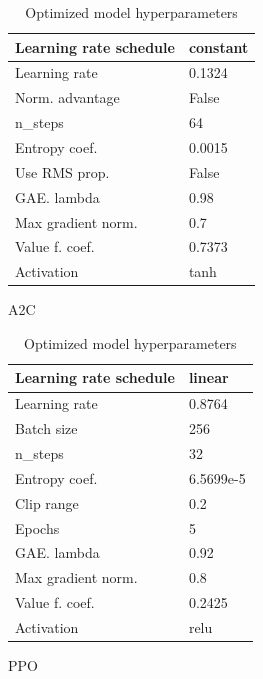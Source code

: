 \documentclass{article}
\begin{document}
\begin{table}[H]
	\begin{subtable}[h]{0.45\textwidth}
		\centering
		\begin{tabular}{|l | l|}
		\hline
		Learning rate schedule & constant  \\
		\hline
		Learning rate & 0.1324  \\
		\hline
		Norm. advantage & False  \\
		\hline
		n\_steps & 64  \\
		\hline
		Entropy coef. & 0.0015 \\
		\hline
		Use RMS prop. & False  \\
		\hline
		GAE. lambda & 0.98 \\
		\hline
		Max gradient norm. & 0.7  \\
		\hline
		Value f. coef. & 0.7373  \\
		\hline
		Activation  & tanh  \\
		\hline
		\end{tabular}
		\caption{A2C}
		\label{tab:a2c}
	\end{subtable}
	\hfill
	\begin{subtable}[h]{0.45\textwidth}
		\centering
		\begin{tabular}{|l | l |}
		\hline
		Learning rate schedule & linear \\
		\hline 
		Learning rate & 0.8764  \\
		\hline
		Batch size & 256  \\
		\hline
		n\_steps & 32  \\
		\hline
		Entropy coef. & 6.5699e-5 \\
		\hline
		Clip range & 0.2  \\
		\hline
		Epochs & 5 \\
		\hline
		GAE. lambda & 0.92 \\
		\hline
		Max gradient norm. &  0.8 \\
		\hline
		Value f. coef. & 0.2425  \\
		\hline
		Activation & relu \\
		\hline
		\end{tabular}
		\caption{PPO}
		\label{tab:ppo}
	\end{subtable}
	\caption{Optimized model hyperparameters}
	\label{tab:hyp}
\end{table}
\end{document}
